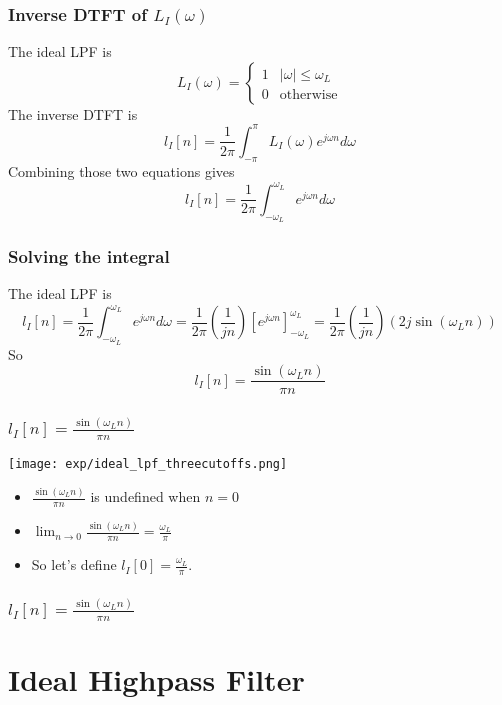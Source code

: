 \documentclass{beamer}
\begin{document}
\begin{frame}
  \frametitle{Inverse DTFT of $L_I(\omega)$}

  The ideal LPF is
  \[
  L_I(\omega)
  = \begin{cases} 1& |\omega|\le\omega_L\\
    0 & \mbox{otherwise}
  \end{cases}
  \]
  The inverse DTFT is
  \[
  l_I[n] = \frac{1}{2\pi}\int_{-\pi}^\pi L_I(\omega)e^{j\omega n}d\omega
  \]
  Combining those two equations gives
  \[
  l_I[n] = \frac{1}{2\pi}\int_{-\omega_L}^{\omega_L}e^{j\omega n}d\omega
  \]
\end{frame}

\begin{frame}
  \frametitle{Solving the integral}

  The ideal LPF is
  \[
  l_I[n] = \frac{1}{2\pi}\int_{-\omega_L}^{\omega_L}e^{j\omega n}d\omega
  = \frac{1}{2\pi}\left(\frac{1}{jn}\right)\left[e^{j\omega n}\right]_{-\omega_L}^{\omega_L}
  = \frac{1}{2\pi}\left(\frac{1}{jn}\right)\left(2j\sin(\omega_L n)\right)
  \]
  So
  \[
  l_I[n]= \frac{\sin(\omega_L n)}{\pi n}
  \]
\end{frame}

\begin{frame}
  \frametitle{$l_I[n]=\frac{\sin(\omega_L n)}{\pi n}$}

  \centerline{\texttt{[image: exp/ideal\_lpf\_threecutoffs.png]}}
  \begin{itemize}
  \item $\frac{\sin(\omega_L n)}{\pi n}$ is undefined when $n=0$
  \item $\lim_{n\rightarrow 0}\frac{\sin(\omega_L n)}{\pi n}=\frac{\omega_L}{\pi}$
  \item So let's define $l_I[0]=\frac{\omega_L}{\pi}$.
  \end{itemize}
\end{frame}



\begin{frame}
  \frametitle{$l_I[n]=\frac{\sin(\omega_L n)}{\pi n}$}

  \centerline{}
\end{frame}

\section[Ideal HPF]{Ideal Highpass Filter}
\setcounter{subsection}{1}
\end{document}
